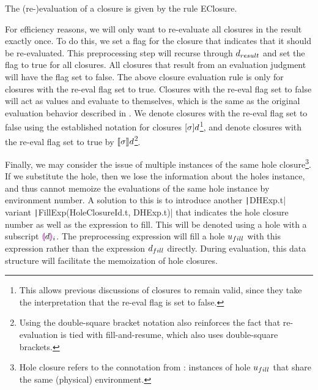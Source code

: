 
The (re-)evaluation of a closure is given by the rule EClosure.

\begin{singlespace}
  \begin{mathpar}
  \end{mathpar}
\end{singlespace}

For efficiency reasons, we will only want to re-evaluate all closures in the result exactly once. To do this, we set a flag for the closure that indicates that it should be re-evaluated. This preprocessing step will recurse through $\dresult$ and set the flag to true for all closures. All closures that result from an evaluation judgment will have the flag set to false. The above closure evaluation rule is only for closures with the re-eval flag set to true. Closures with the re-eval flag set to false will act as values and evaluate to themselves, which is the same as the original evaluation behavior described in . We denote closures with the re-eval flag set to false using the established notation for closures $[\env]d$\footnote{This allows previous discussions of closures to remain valid, since they take the interpretation that the re-eval flag is set to false.}, and denote closures with the re-eval flag set to true by $\llbracket\env\rrbracket d$\footnote{Using the double-square bracket notation also reinforces the fact that re-evaluation is tied with fill-and-resume, which also uses double-square brackets.}.

Finally, we may consider the issue of multiple instances of the same hole closure\footnote{Hole closure refers to the connotation from : instances of hole $\ufill$ that share the same (physical) environment.}. If we substitute the hole, then we lose the information about the holes instance, and thus cannot memoize the evaluations of the same hole instance by environment number. A solution to this is to introduce another \texttt|DHExp.t| variant \texttt|FillExp(HoleClosureId.t, DHExp.t)| that indicates the hole closure number as well as the expression to fill. This will be denoted using a hole with a subscript $\hhole{d}_i$. The preprocessing expression will fill a hole $\ufill$ with this expression rather than the expression $\dfill$ directly. During evaluation, this data structure will facilitate the memoization of hole closures.

